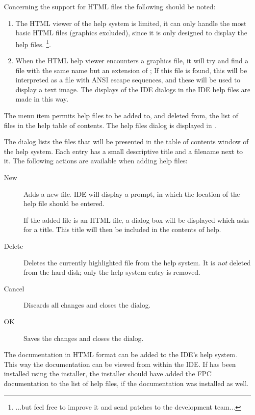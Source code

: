 \begin{remark}
Concerning the support for HTML files the following should be noted:
\begin{enumerate}
\item
The HTML viewer of the  help system is limited, it can only handle the
most basic HTML files (graphics excluded), since it is only designed
to display the \fpc help files. \footnote{...but feel free to improve it and send patches to the
\fpc development team...}.
\item
When the HTML help viewer encounters a graphics file, it will try and find a
file with the same name but an extension of ; If this file is
found, this will be interpreted as a file with ANSI escape sequences, and
these will be used to display a text image. The displays of the IDE dialogs
in the IDE help files are made in this way.
\end{enumerate}
\end{remark}

The menu item  permits help files to be added to, 
and deleted from, the list of files in the help table of contents.
The help files dialog is displayed in .


The dialog lists the files that will be presented in the table of contents
window of the help system. Each entry has a small descriptive title and a
filename next to it. The following actions are available when adding help
files:
\begin{description}
\item[New] Adds a new file. IDE will display a prompt, in which the
location of the help file should be entered.

If the added file is an HTML file, a dialog box will be displayed
which asks for a title. This title will then be included in the
contents of help.
\item[Delete] Deletes the currently highlighted file from the help system.
It is \emph{not} deleted from the hard disk; only the help system entry is
removed.
\item[Cancel] Discards all changes and closes the dialog.
\item[OK] Saves the changes and closes the dialog.
\end{description}

The \fpc documentation in HTML format can be added to the IDE's help system.
This way the documentation can be viewed from within the IDE. If \fpc has
been installed using the installer, the installer should have added the
FPC documentation to the list of help files, if the documentation was
installed as well.

